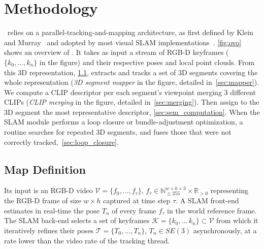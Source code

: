 \section{\ours Methodology}
~\ours relies on a parallel-tracking-and-mapping architecture, as first defined by Klein and Murray~\cite{klein2007parallel} and adopted by most visual SLAM implementations~\cite{campos2021orb}. \cref{fig:ovo} shows an overview of \ours.
It takes as input a stream of RGB-D keyframes ($\{ k_0, \hdots, k_n\}$ in the figure) and their respective poses and local point clouds. 
From this 3D representation, \cref{sec:map}, \ours extracts and tracks a set of 3D segments covering the whole representation (\emph{3D segment mapper} in the figure, detailed in~\cref{sec:mapper}). 
We compute a CLIP descriptor per each segment's viewpoint merging 3 different CLIPs (\emph{CLIP merging} in the figure, detailed in~\cref{sec:merging}). Then assign to the 3D segment the most representative descriptor, \cref{sec:sem_computation}. 
When the SLAM module performs a loop closure or bundle-adjustment optimization, a routine searches for repeated 3D segments, and fuses those that were not correctly tracked,~\cref{sec:loop_closure}.
\subsection{Map Definition}
\label{sec:map}
%
Its input is an RGB-D video \(\mathcal{V} = \{f_0, \hdots, f_\tau\}\), \(f_\tau \in \mathbb{N}_{\leq 255}^{w \times h \times 3} \times \mathbb{R}_{>0}\) representing the RGB-D frame of size $w \times h$ captured at time step \(\tau\). A SLAM front-end estimates in real-time the pose \(T_n\) of every frame \(f_\tau\) in the world reference frame. The SLAM back-end selects a set of keyframes \(\mathcal{K} = \{k_0, \hdots\, k_n\} \subset \mathcal{V}\) from which it iteratively refines their poses $\mathcal{T} = \{T_{0}, \hdots, T_{n}\}$, \(T_{n} \in SE(3)\) asynchronously, at a rate lower than the video rate of the tracking thread. 

